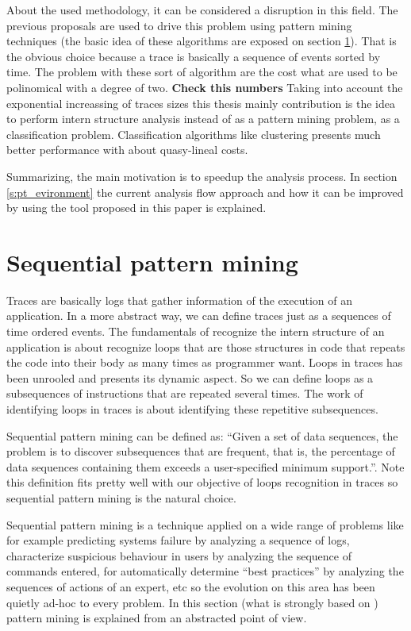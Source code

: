 About the used methodology, it can be considered a disruption in this field. The
previous proposals are used to drive this problem using pattern mining
techniques (the basic idea of these algorithms are exposed on section
\ref{pattern_mining}). That is the obvious choice because a trace is basically a
sequence of events sorted by time. The problem with these sort of algorithm are
the cost what are used to be polinomical with a degree of two. {\bf Check
this numbers} Taking into account the exponential increassing of traces sizes 
this thesis mainly contribution is the idea to perform intern 
structure analysis instead of as a pattern mining problem, as a classification
problem. Classification algorithms like clustering presents much better
performance with about quasy-lineal costs.

Summarizing, the main motivation is to speedup the analysis process. In section
\ref{s:pt_evironment} the current analysis flow approach and how it can be
improved by using the tool proposed in this paper is explained.

\section{Sequential pattern mining}\label{pattern_mining}

Traces are basically logs that gather information of the execution of an
application. In a more abstract way, we can define traces just as a sequences
of time ordered events. The fundamentals of recognize the intern structure of an
application is about recognize loops that are those structures in code that
repeats the code into their body as many times as programmer want. Loops in
traces has been unrooled and presents its dynamic aspect. So we can define loops
as a subsequences of instructions that are repeated several times. The work of
identifying loops in traces is about identifying these repetitive subsequences.

Sequential pattern mining can be defined as: “Given a set of data sequences, the
problem is to discover subsequences that are frequent, that is, the percentage of
data sequences containing them exceeds a user-specified minimum support.”. Note 
this definition fits pretty well with our objective of loops recognition in traces 
so sequential pattern mining is the natural choice. 

Sequential pattern mining is a technique applied on a wide range of problems
like for example predicting systems failure by analyzing a sequence of logs,
characterize suspicious behaviour in users by analyzing the sequence of commands
entered, for automatically determine “best practices” by analyzing the sequences
of actions of an expert, etc so the evolution on this area has been quietly
ad-hoc to every problem. In this section (what is strongly based on
\cite{mooney2013sequential}) pattern mining is explained from an abstracted
point of view.

